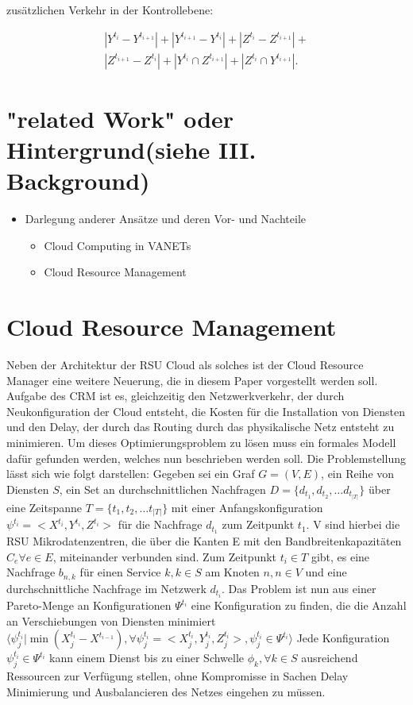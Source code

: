\documentclass[conference]{IEEEtran}
\begin{document}
zusätzlichen Verkehr in der Kontrollebene: 

\begin{equation}
\begin{split}
 |Y^{t_i}-Y^{t_{i+1}}|+|Y^{t_{i+1}}-Y^{t_{i}}|+|Z^{t_i}-Z^{t_{i+1}}|+ \\|Z^{t_{i+1}}-Z^{t_{i}}|+|Y^{t_i} \cap Z^{t_{i+1}}|+|Z^{t_{i}} \cap Y^{t_{i+1}}|.
 \end{split}
\end{equation}


\section{"related Work" oder Hintergrund(siehe III. Background)}
\begin{itemize}
\item Darlegung anderer Ansätze und deren Vor- und Nachteile
\begin{itemize}
\item Cloud Computing in VANETs
\item Cloud Resource Management
\end{itemize}
\end{itemize}

\section{Cloud Resource Management}

Neben der Architektur der RSU Cloud als solches ist der Cloud Resource Manager eine weitere
Neuerung, die in diesem Paper vorgestellt werden soll.  Aufgabe des CRM ist es, gleichzeitig den Netzwerkverkehr, der durch Neukonfiguration der Cloud entsteht, die Kosten für die Installation von Diensten und den Delay, der durch das Routing durch das physikalische Netz entsteht zu minimieren.
Um dieses Optimierungsproblem zu lösen muss ein formales Modell dafür gefunden werden, welches nun beschrieben werden soll. Die Problemstellung lässt sich wie folgt darstellen: Gegeben sei ein Graf \(G=(V,E)\), ein Reihe von Diensten \(S\), ein Set an durchschnittlichen Nachfragen \(D=\{d_{t_1},d_{t_2},…d_{t_{|T|}}\}\) über eine Zeitspanne \(T=\{t_1,t_2,… t_{|T|}\}\) mit einer Anfangskonfiguration \(\psi^{t_i}=<X^{t_i},Y^{t_i},Z^{t_i}>\) für die Nachfrage \(d_{t_1}\)
zum Zeitpunkt \(t_1\). V sind hierbei die RSU Mikrodatenzentren, die über die Kanten E mit
den Bandbreitenkapazitäten \(C_e \forall e \in E\), miteinander verbunden sind. Zum
Zeitpunkt \(t_i \in T\) gibt, es eine Nachfrage \(b_{n,k}\) für einen Service \(k, k \in S\) am Knoten \(n, n\in V\) und eine durchschnittliche Nachfrage im Netzwerk \(d_{t_i}\). Das Problem ist nun aus einer Pareto-Menge an Konfigurationen \(\Psi^{t_i}\) eine Konfiguration zu finden, die die Anzahl an Verschiebungen von Diensten minimiert \(\langle \psi_{j}^{t_i}|\min(X_{j}^{t_i}-X^{t_{i-1}}),\forall \psi_{j}^{t_i}=<X_{j}^{t_i},Y_{j}^{t_i},Z_{j}^{t_i}>, \psi_{j}^{t_i} \in \Psi^{t_i}  \rangle\) Jede Konfiguration \(\psi_{j}^{t_i} \in \Psi^{t_i}\) kann einem Dienst bis zu einer Schwelle \(\phi_k, \forall k \in S\) ausreichend Ressourcen zur Verfügung stellen, ohne Kompromisse in Sachen Delay Minimierung und Ausbalancieren des Netzes eingehen zu müssen.\\
\end{document}
